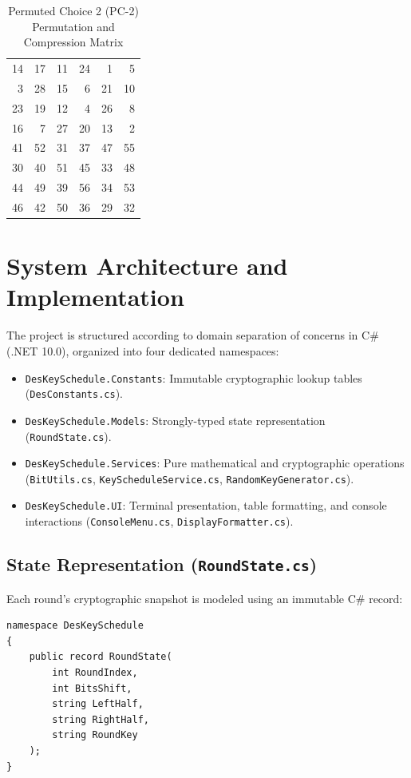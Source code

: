 \documentclass[12pt,a4paper]{article}
\begin{document}
\begin{table}[h!]
    \centering
    \caption{Permuted Choice 2 (PC-2) Permutation and Compression Matrix}
    \label{tab:pc2}
    \begin{tabular}{rrrrrr}
        \toprule
        14 & 17 & 11 & 24 &  1 &  5 \\
         3 & 28 & 15 &  6 & 21 & 10 \\
        23 & 19 & 12 &  4 & 26 &  8 \\
        16 &  7 & 27 & 20 & 13 &  2 \\
        41 & 52 & 31 & 37 & 47 & 55 \\
        30 & 40 & 51 & 45 & 33 & 48 \\
        44 & 49 & 39 & 56 & 34 & 53 \\
        46 & 42 & 50 & 36 & 29 & 32 \\
        \bottomrule
    \end{tabular}
\end{table}

\section{System Architecture and Implementation}

The project is structured according to domain separation of concerns in C\# (.NET 10.0), organized into four dedicated namespaces:

\begin{itemize}
    \item \texttt{DesKeySchedule.Constants}: Immutable cryptographic lookup tables (\texttt{DesConstants.cs}).
    \item \texttt{DesKeySchedule.Models}: Strongly-typed state representation (\texttt{RoundState.cs}).
    \item \texttt{DesKeySchedule.Services}: Pure mathematical and cryptographic operations (\texttt{BitUtils.cs}, \texttt{KeyScheduleService.cs}, \texttt{RandomKeyGenerator.cs}).
    \item \texttt{DesKeySchedule.UI}: Terminal presentation, table formatting, and console interactions (\texttt{ConsoleMenu.cs}, \texttt{DisplayFormatter.cs}).
\end{itemize}

\subsection{State Representation (\texttt{RoundState.cs})}
Each round's cryptographic snapshot is modeled using an immutable C\# record:
\begin{lstlisting}
namespace DesKeySchedule
{
    public record RoundState(
        int RoundIndex, 
        int BitsShift, 
        string LeftHalf, 
        string RightHalf, 
        string RoundKey
    );
}
\end{lstlisting}
\end{document}
